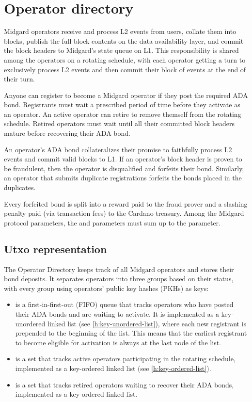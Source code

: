 \documentclass[../midgard.tex]{subfiles}
\begin{document}
\section{Operator directory}
\label{h:operator-directory}

Midgard operators receive and process L2 events from users, collate them into blocks, publish the full block contents on the data availability layer, and commit the block headers to Midgard's state queue on L1. This responsibility is shared among the operators on a rotating schedule, with each operator getting a turn to exclusively process L2 events and then commit their block of events at the end of their turn.

Anyone can register to become a Midgard operator if they post the required ADA bond. Registrants must wait a prescribed period of time before they activate as an operator. An active operator can retire to remove themself from the rotating schedule. Retired operators must wait until all their committed block headers mature before recovering their ADA bond.

An operator's ADA bond collateralizes their promise to faithfully process L2 events and commit valid blocks to L1. If an operator's block header is proven to be fraudulent, then the operator is disqualified and forfeits their bond. Similarly, an operator that submits duplicate registrations forfeits the bonds placed in the duplicates.

Every forfeited bond is split into a reward paid to the fraud prover and a slashing penalty paid (via transaction fees) to the Cardano treasury. Among the Midgard protocol parameters, the  and  parameters must sum up to the  parameter.

\subsection{Utxo representation}
\label{h:operator-directory-utxo-representation}

The Operator Directory keeps track of all Midgard operators and stores their bond deposits. It separates operators into three groups based on their status, with every group using operators' public key hashes (PKHs) as keys:
\begin{itemize}
    \item {} is a first-in-first-out (FIFO) queue that tracks operators who have posted their ADA bonds and are waiting to activate. It is implemented as a key-unordered linked list (see \cref{h:key-unordered-list}), where each new registrant is prepended to the beginning of the list. This means that the earliest registrant to become eligible for activation is always at the last node of the list.
    \item {} is a set that tracks active operators participating in the rotating schedule, implemented as a key-ordered linked list (see \cref{h:key-ordered-list}). 
    \item {} is a set that tracks retired operators waiting to recover their ADA bonds, implemented as a key-ordered linked list.
\end{itemize}
\end{document}
